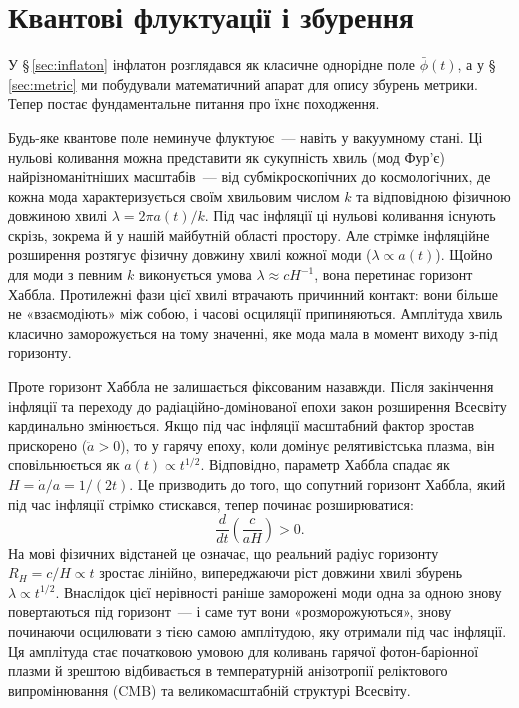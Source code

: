 
\chapter{Квантові флуктуації і збурення}
\label{sec:quantum}

У §\,\ref{sec:inflaton} інфлатон розглядався як класичне однорідне
поле $\bar{\phi}(t)$, а у §\,\ref{sec:metric} ми побудували математичний апарат
для опису збурень метрики. Тепер постає фундаментальне питання про
їхнє походження.

Будь-яке квантове поле неминуче флуктуює~--- навіть у вакуумному стані.
Ці нульові коливання можна представити як сукупність хвиль (мод Фур'є)
найрізноманітніших масштабів~--- від субмікроскопічних до космологічних,
де кожна мода характеризується своїм хвильовим числом $k$ та відповідною
фізичною довжиною хвилі $\lambda = 2\pi a(t)/k$. Під час інфляції ці
нульові коливання існують скрізь, зокрема й у нашій майбутній області простору.
Але стрімке інфляційне розширення розтягує фізичну довжину хвилі кожної моди
($\lambda \propto a(t)$). Щойно для моди з певним $k$ виконується умова
$\lambda \approx cH^{-1}$, вона перетинає горизонт Хаббла. Протилежні фази
цієї хвилі втрачають причинний контакт: вони більше не «взаємодіють» між
собою, і часові осциляції припиняються. Амплітуда хвиль класично
заморожується на тому значенні, яке мода мала в момент виходу з-під горизонту.

Проте горизонт Хаббла не залишається фіксованим назавжди. Після закінчення
інфляції та переходу до радіаційно-домінованої епохи закон розширення Всесвіту
кардинально змінюється. Якщо під час інфляції масштабний фактор зростав
прискорено ($\ddot{a} > 0$), то у гарячу епоху, коли домінує релятивістська
плазма, він сповільнюється як $a(t) \propto t^{1/2}$. Відповідно, параметр
Хаббла спадає як $H = \dot{a}/a = 1/(2t)$. Це призводить до того, що
сопутний горизонт Хаббла, який під час інфляції стрімко стискався, тепер
починає розширюватися:
\begin{equation}
\frac{d}{dt} \left( \frac{c}{aH} \right) > 0.
\label{eq:horizon_growth}
\end{equation}
На мові фізичних відстаней це означає, що реальний радіус горизонту
$R_H = c/H \propto t$ зростає лінійно, випереджаючи ріст довжини хвилі
збурень $\lambda \propto t^{1/2}$. Внаслідок цієї нерівності раніше
заморожені моди одна за одною знову повертаються під горизонт~--- і саме тут
вони «розморожуються», знову починаючи осцилювати з тією самою амплітудою,
яку отримали під час інфляції. Ця амплітуда стає початковою умовою для
коливань гарячої фотон-баріонної плазми й зрештою відбивається в температурній
анізотропії реліктового випромінювання (CMB) та великомасштабній структурі Всесвіту.

